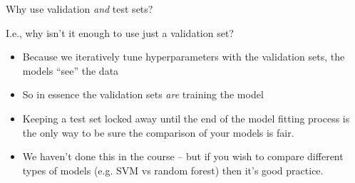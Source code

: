 \documentclass[mathserif, aspectratio=169]{beamer}
\begin{document}
\begin{frame}{Why use validation \textit{and} test sets?}

I.e., why isn't it enough to use just a validation set? \pause
	\begin{itemize}
		\item Because we iteratively tune hyperparameters with the validation sets, the models ``see'' the data
		\item So in essence the validation sets \textit{are} training the model
		\item Keeping a test set locked away until the end of the model fitting process is the only way to be sure the comparison of your models is fair.
		\item We haven't done this in the course -- but if you wish to compare different types of models (e.g. SVM vs random forest) then it's good practice.
	\end{itemize}
\end{frame}
\end{document}
